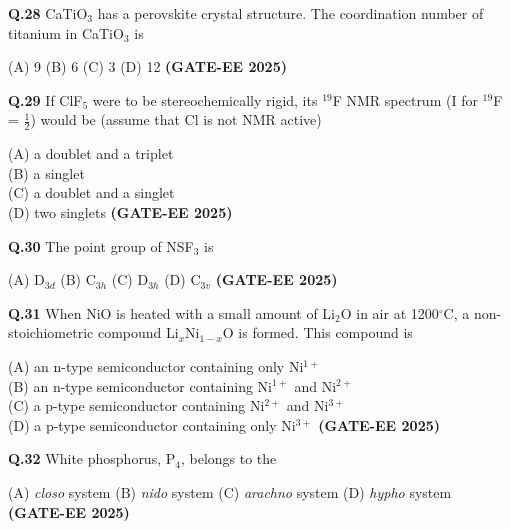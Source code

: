 \documentclass[12pt]{article}
\begin{document}
\begin{enumerate}
\vspace{0.5cm}

\textbf{Q.28} CaTiO$_3$ has a perovskite crystal structure. The coordination number of titanium in CaTiO$_3$ is

(A) 9 \hspace{1cm}
(B) 6 \hspace{1cm}
(C) 3 \hspace{1cm}
(D) 12   \textbf{(GATE-EE 2025)}


\vspace{0.5cm}

\textbf{Q.29} If ClF$_5$ were to be stereochemically rigid, its $^{19}$F NMR spectrum (I for $^{19}$F = $\frac{1}{2}$) would be (assume that Cl is not NMR active)

(A) a doublet and a triplet\\
(B) a singlet\\
(C) a doublet and a singlet\\
(D) two singlets   \textbf{(GATE-EE 2025)}


\vspace{0.5cm}

\textbf{Q.30} The point group of NSF$_3$ is

(A) D$_{3d}$ \hspace{1cm}
(B) C$_{3h}$ \hspace{1cm}
(C) D$_{3h}$ \hspace{1cm}
(D) C$_{3v}$   \textbf{(GATE-EE 2025)}


\textbf{Q.31} When NiO is heated with a small amount of Li$_2$O in air at 1200$^\circ$C, a non-stoichiometric compound Li$_x$Ni$_{1-x}$O is formed. This compound is

(A) an n-type semiconductor containing only Ni$^{1+}$\\
(B) an n-type semiconductor containing Ni$^{1+}$ and Ni$^{2+}$\\
(C) a p-type semiconductor containing Ni$^{2+}$ and Ni$^{3+}$\\
(D) a p-type semiconductor containing only Ni$^{3+}$   \textbf{(GATE-EE 2025)}


\vspace{0.5cm}

\textbf{Q.32} White phosphorus, P$_4$, belongs to the

(A) \textit{closo} system \hspace{1cm}
(B) \textit{nido} system \hspace{1cm}
(C) \textit{arachno} system \hspace{1cm}
(D) \textit{hypho} system   \textbf{(GATE-EE 2025)}



\end{enumerate}
\end{document}
